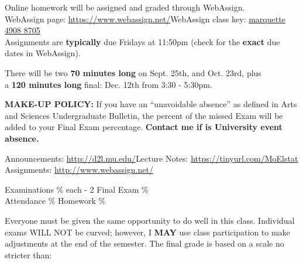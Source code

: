 \documentclass[10pt]{article}
\begin{document}
\begin{description}
\item[Homework:] Online homework will be assigned and graded through WebAssign.\\
WebAssign page: \url{https://www.webassign.net/}\qquad\qquad\qquad\qquad WebAssign class key: {\color{blue}\href{https://www.getenrolled.com/?courseKey=marquette49088705}{marquette 4908 8705}}\\ 
Assignments are \textbf{typically} due Fridays at 11:50pm (check for the \textbf{exact} due dates in WebAssign). 

\item[Exams:] There will be two {\bf{70 minutes long}} on Sept. 25th, and Oct. 23rd, plus\\
\hspace*{5.2mm} a {\bf{120 minutes long}} final: Dec. 12th from 3:30 - 5:30pm. \vspace{-.1in}

\item \textbf{MAKE-UP POLICY:} If you have an ``unavoidable absence'' as defined in Arts and Sciences Undergraduate Bulletin, the percent of the missed Exam will be added to your Final Exam percentage. \textbf{Contact me if is University event absence.}

\item[Websites:] Announcements: \url{http://d2l.mu.edu/}\qquad\qquad Lecture Notes: \url{https://tinyurl.com/MoElstat}\\ \qquad Assignments: \url{http://www.webassign.net/}

\item[Grading:] Examinations  \% each - 2 \qquad\qquad\qquad Final Exam  \% \\
\hspace*{7.5mm} Attendance \% \qquad\qquad\qquad\qquad\qquad Homework \%\vspace{-.1in}
 
Everyone must be given the same opportunity to do well in this class. Individual exams WILL NOT be curved; however, I \textbf{MAY} use class participation to make adjustments at the end of the semester. The final grade is based on a scale no stricter than:\vspace{-.05in}


\end{description}
\end{document}
